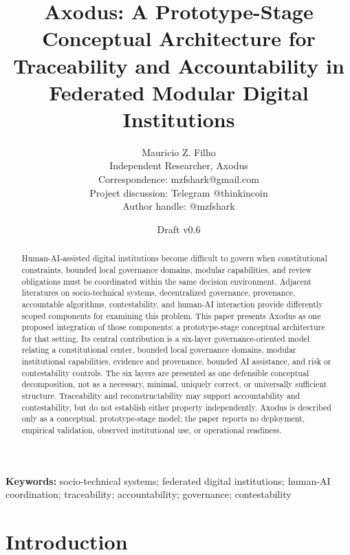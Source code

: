 \documentclass[11pt]{article}
\title{Axodus: A Prototype-Stage Conceptual Architecture for Traceability and Accountability in Federated Modular Digital Institutions}
\author{Mauricio Z. Filho\\
\small Independent Researcher, Axodus\\
\small Correspondence: mzfshark@gmail.com\\
\small Project discussion: Telegram @thinkincoin\\
\small Author handle: @mzfshark}
\date{Draft v0.6}
\begin{document}
\maketitle

\begin{landscape}
\begin{center}
\end{center}

\begin{abstract}
Human-AI-assisted digital institutions become difficult to govern when
constitutional constraints, bounded local governance domains, modular
capabilities, and review obligations must be coordinated within the same
decision environment. Adjacent literatures on socio-technical systems,
decentralized governance, provenance, accountable algorithms, contestability,
and human-AI interaction provide differently scoped components for examining
this problem. This paper presents Axodus as one proposed integration of those
components: a prototype-stage conceptual architecture for that setting. Its
central contribution is a six-layer governance-oriented model relating a
constitutional center, bounded local governance domains, modular
institutional capabilities, evidence and provenance, bounded AI assistance,
and risk or contestability controls. The six layers are presented as one
defensible conceptual decomposition, not as a necessary, minimal, uniquely
correct, or universally sufficient structure. Traceability and
reconstructability may support accountability and contestability, but do not
establish either property independently. Axodus is described only as a
conceptual, prototype-stage model; the paper reports no deployment, empirical
validation, observed institutional use, or operational readiness.
\end{abstract}

\noindent\textbf{Keywords:} socio-technical systems; federated digital
institutions; human-AI coordination; traceability; accountability;
governance; contestability

\section{Introduction}


\end{landscape}
\end{document}

